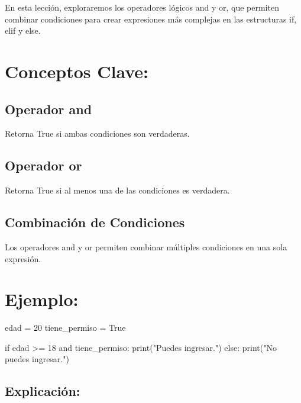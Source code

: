 \documentclass[
  a4paper,
  DIV=11,
  numbers=noendperiod,
  onepage,
  openany]{scrreprt}
\newenvironment{Shaded}{\begin{snugshade}}{\end{snugshade}}
\newcommand{\BuiltInTok}[1]{\textcolor[rgb]{0.00,0.23,0.31}{#1}}
\newcommand{\ControlFlowTok}[1]{\textcolor[rgb]{0.00,0.23,0.31}{#1}}
\newcommand{\DecValTok}[1]{\textcolor[rgb]{0.68,0.00,0.00}{#1}}
\newcommand{\KeywordTok}[1]{\textcolor[rgb]{0.00,0.23,0.31}{#1}}
\newcommand{\NormalTok}[1]{\textcolor[rgb]{0.00,0.23,0.31}{#1}}
\newcommand{\OperatorTok}[1]{\textcolor[rgb]{0.37,0.37,0.37}{#1}}
\newcommand{\StringTok}[1]{\textcolor[rgb]{0.13,0.47,0.30}{#1}}
\newcommand{\VariableTok}[1]{\textcolor[rgb]{0.07,0.07,0.07}{#1}}
\begin{document}
En esta lección, exploraremos los operadores lógicos and y or, que
permiten combinar condiciones para crear expresiones más complejas en
las estructuras if, elif y else.

\section{Conceptos Clave:}\label{conceptos-clave-15}

\subsection{Operador and}\label{operador-and}

Retorna True si ambas condiciones son verdaderas.

\subsection{Operador or}\label{operador-or}

Retorna True si al menos una de las condiciones es verdadera.

\subsection{Combinación de
Condiciones}\label{combinaciuxf3n-de-condiciones}

Los operadores and y or permiten combinar múltiples condiciones en una
sola expresión.

\section{Ejemplo:}\label{ejemplo-10}

\begin{Shaded}
\begin{Highlighting}[]
\NormalTok{edad }\OperatorTok{=} \DecValTok{20}
\NormalTok{tiene\_permiso }\OperatorTok{=} \VariableTok{True}

\ControlFlowTok{if}\NormalTok{ edad }\OperatorTok{\textgreater{}=} \DecValTok{18} \KeywordTok{and}\NormalTok{ tiene\_permiso:}
    \BuiltInTok{print}\NormalTok{(}\StringTok{"Puedes ingresar."}\NormalTok{)}
\ControlFlowTok{else}\NormalTok{:}
    \BuiltInTok{print}\NormalTok{(}\StringTok{"No puedes ingresar."}\NormalTok{)}
\end{Highlighting}
\end{Shaded}

\subsection{Explicación:}\label{explicaciuxf3n-22}
\end{document}
